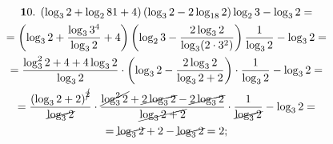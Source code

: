 \begin{multline*}
{\mathbf 10.}\;
\left(\log_3 2 + \log_2 81 + 4\right)\left(\log_3 2 - 2\log_{18} 2\right)\log_2 3 - \log_3 2 =\\
= \left(\log_3 2 + \frac{\log_3 3^4}{\log_3 2} + 4\right)\left(\log_2 3 - \frac{2\log_3 2}{\log_3 (2 \cdot 3^2)}\right)\frac{1}{\log_3 2} - \log_3 2 =\\
= \frac{\log_3^2 2 + 4 + 4\log_3 2}{\log_3 2} \cdot \left(\log_3 2 - \frac{2\log_3 2}{\log_3 2 + 2}\right) \cdot \frac{1}{\log_3 2} - \log_3 2 =\\
= \frac{\left(\log_3 2 + 2\right)^{\cancel{2}}}{\cancel{\log_3 2}} \cdot \frac{\cancel{\log_3^2 2} + \cancel{2\log_3 2} - \cancel{2\log_3 2}}{\cancel{\log_3 2 + 2}} \cdot \frac{1}{\cancel{\log_3 2}} - \log_3 2 =\\
= \cancel{\log_3 2} + 2 - \cancel{\log_3 2} = 2;
\end{multline*}